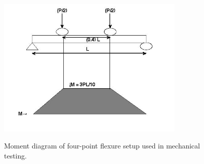\documentclass[12pt]{article}
\begin{document}
\begin{figure}[H]
	\centering
	\includegraphics[width=0.8\textwidth]{4ptMomentDiagram.jpg}\label{fig:Mdiagram}
	\caption{Moment diagram of four-point flexure setup used in mechanical testing.}
\end{figure}

\end{document}
